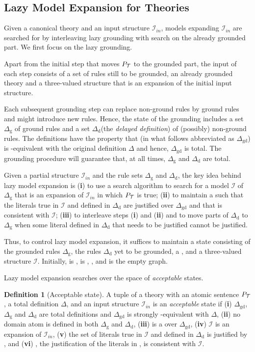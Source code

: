 \documentclass[11pt]{article}
\newcommand{\m}[1]{\ensuremath{#1}\xspace}
\newcommand{\I}{\m{\mathcal{I}}}
\newcommand{\Iin}{\m{\I_{in}}}
\newcommand{\theory}{\m{\mathcal{T}}}
\newcommand{\D}{\m{\Delta}}
\newcommand{\logicname}[1]{\text{\sc #1}\xspace}
\newcommand{\foid}{\logicname{FO(\ensuremath{ID})}}
\theoremstyle{plain}
\theoremstyle{definition}
\newtheorem{definition}[thm]{Definition}
\theoremstyle{example_basic}
\theoremstyle{example_contd}
\theoremstyle{plain}
\newcommand{\Dg}{\ensuremath{\D_\text{g}}\xspace}
\newcommand{\Dd}{\ensuremath{\D_\text{d}}\xspace}
\newcommand{\Dgd}{\ensuremath{\D_\text{gd}}\xspace}
\newcommand{\pt}{\ensuremath{P_\text{\theory}}\xspace}
\newcommand{\tbf}[1]{\textbf{#1}}
\newcommand{\change}[1]{#1}
\begin{document}
\subsection{Lazy Model Expansion for \foid Theories}\label{sec:lazy-foid}

\change{Given a canonical theory   and an input structure \Iin, models expanding \Iin are searched for by interleaving lazy grounding with search on the already grounded part. We first focus on the lazy grounding.}

\change{Apart from the initial step that moves \pt to the grounded part, the input of each step consists of a set of rules still to be grounded, an already grounded theory and a three-valued structure that is an expansion of the initial input structure.}

Each subsequent grounding step can replace non-ground rules by ground
rules and might introduce new rules. Hence, the state of the grounding
includes a set \Dg of ground rules and a set \Dd \change{(the \emph{delayed
  definition})} of (possibly) non-ground rules. The definitions have the property that  (in what follows abbreviated as \Dgd) is \vocf{\D}-equivalent with the original definition \D and hence, \Dgd is total.
The grounding procedure will guarantee that, at all times, \Dg and \Dd are total.

Given a partial structure \Iin and the rule sets \Dg and \Dd, the
key idea behind lazy model expansion is
(\tbf{i}) to use a search algorithm to search for a model \I of \Dg that is an expansion of \Iin in which \pt is true; 
(\tbf{ii}) to maintain a \justification \jgraph such that the
literals true in \I and defined in \Dd are justified over \Dgd and
that \jgraph is consistent with \I;
(\tbf{iii}) to interleave steps (\tbf{i}) and (\tbf{ii}) and to move parts of \Dd to \Dg when some literal defined in \Dd that needs to be justified cannot be justified.
 
Thus, to control lazy model expansion, it suffices to maintain a state  consisting of the grounded rules \Dg, the rules \Dd yet to be grounded, a \justification \jgraph, and a three-valued structure \I. Initially,  is ,  is , , and \jgraph is the empty graph.

Lazy model expansion searches over the space of \emph{acceptable} states.

\begin{definition}[Acceptable state]\label{def:acc_state} 
A tuple  of a theory with an atomic sentence \pt, a total definition \D, and an input structure \Iin is an \emph{acceptable} state if
(\tbf{i}) \Dgd, \Dg and \Dd are total definitions and \Dgd is strongly \vocf{\D}-equivalent with \D, 
(\tbf{ii}) no domain atom is defined in both \Dg and \Dd, 
(\tbf{iii}) \jgraph is a \justification over \Dgd,
(\tbf{iv}) \I is an expansion of \Iin,
(\tbf{v}) the set   of literals true in \I and defined in \Dd is justified by \jgraph, and
(\tbf{vi}) , \change{the justification of the literals in ,} is consistent with \I.
\end{definition}
\end{document}

